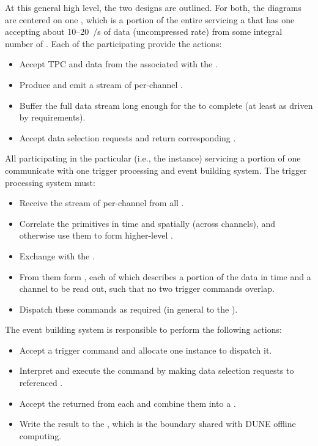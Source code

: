At this general high level, the two designs are outlined. %
For both, the diagrams are %
centered on one 
, which is a portion of the entire  servicing a
 that has one  accepting about
\numrange{10}{20}~\si{\Gbps/\s} of data (uncompressed rate) from some integral
number of . 
Each of the participating  provide the actions:
\begin{itemize}
\item Accept TPC and  data from the  associated with the .
\item Produce and emit a stream of per-channel .
\item Buffer the full data stream long enough for the  to complete (at least \snbpretime as driven by  requirements).
\item Accept data selection requests and return corresponding .
\end{itemize}

All participating  in the particular 
(i.e., the  instance) servicing a portion of one 
communicate with one trigger processing and event building system.
The trigger processing system must:
\begin{itemize}
\item Receive the stream of per-channel  from all .
\item Correlate the primitives in time and spatially (across channels), and otherwise use them to form higher-level .
\item Exchange  with the .
\item From them form , each of which describes a
  portion of the data in time and a channel to be read out, such that
  no two trigger commands overlap.
\item Dispatch these commands as required (in general to the ).
\end{itemize}
The event building system is responsible to perform the following actions:
\begin{itemize}
\item Accept a trigger command and allocate one  instance to dispatch it.
\item %
Interpret and execute the command by making
  data selection requests to referenced .
\item %
Accept the returned  from each
   and combine them into a .
\item Write the result to the , which is the boundary
  shared with DUNE offline computing.
\end{itemize}

